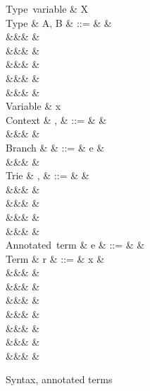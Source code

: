 \begin{figure}[H]
\begin{syntaxfig}
\mbox{Type variable}
&
X
\\[2mm]
\mbox{Type}
&
A, B
&
::=
&
&
\\
&&&
\tyUnit
&
\\
&&&
&
\\
&&&
&
\\
&&&
&
\\
&&&
&
\\[2mm]
\mbox{Variable}
&
x
\\[2mm]
\mbox{Context}
&
\Gamma, \Delta
&
::=
&
\cxtEmpty
&
\\
&&&
&
\\[2mm]
\mbox{Branch}
&
\kappa
&
::=
&
e
&
\\
&&&
\sigma
&
\\[2mm]
\mbox{Trie}
&
\sigma, \tau
&
::=
&
&
\\
&&&
\trieUnit{\kappa}
&
\\
&&&
\trieSum{\sigma}{\tau}
&
\\
&&&
\trieProd{\sigma}
&
\\
&&&
\trieRoll{\sigma}
&
\\[2mm]
\mbox{Annotated term}
&
e
&
::=
&
&
\\[2mm]
\mbox{Term}
&
r
&
::=
&
x
&
\\
&&&
\exUnit
&
\\
&&&
&
\\
&&&
&
\\
&&&
&
\\
&&&
\exFun{\sigma}
&
\\
&&&
&
\\
&&&
&
\end{syntaxfig}
\caption{Syntax, annotated terms}
\label{fig:demand-indexed:syntax}
\end{figure}

